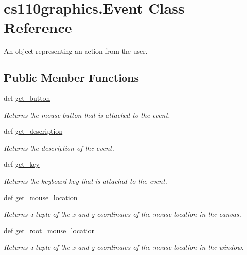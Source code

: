 \hypertarget{classcs110graphics_1_1Event}{
\section{cs110graphics.Event Class Reference}
\label{classcs110graphics_1_1Event}
}


An object representing an action from the user.  
\subsection*{Public Member Functions}
\begin{DoxyCompactItemize}
\item 
def \hyperlink{classcs110graphics_1_1Event_abdb7a2999936cc7ab1119289f05f8243}{get\_\-button}
\begin{DoxyCompactList}\small\item\em Returns the mouse button that is attached to the event. \item\end{DoxyCompactList}\item 
def \hyperlink{classcs110graphics_1_1Event_a7bd201ecbf74db6d78dbf2fb4f622a7c}{get\_\-description}
\begin{DoxyCompactList}\small\item\em Returns the description of the event. \item\end{DoxyCompactList}\item 
def \hyperlink{classcs110graphics_1_1Event_a0d795ddaef92049cee1d7b09898cf225}{get\_\-key}
\begin{DoxyCompactList}\small\item\em Returns the keyboard key that is attached to the event. \item\end{DoxyCompactList}\item 
def \hyperlink{classcs110graphics_1_1Event_a2db4866adee7a6ddb8d32240801fb8ce}{get\_\-mouse\_\-location}
\begin{DoxyCompactList}\small\item\em Returns a tuple of the x and y coordinates of the mouse location in the canvas. \item\end{DoxyCompactList}\item 
def \hyperlink{classcs110graphics_1_1Event_a7c8fb2d5e9288db125801d5a6e66ecf1}{get\_\-root\_\-mouse\_\-location}
\begin{DoxyCompactList}\small\item\em Returns a tuple of the x and y coordinates of the mouse location in the window. \item\end{DoxyCompactList}\end{DoxyCompactItemize}


